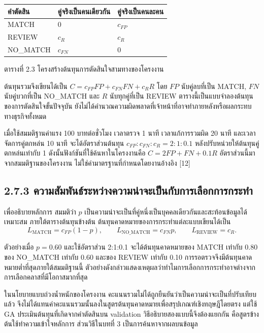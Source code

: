 \begin{center}\small
\begin{tabularx}{\linewidth}{p{3.2cm}XX}
\toprule
คำตัดสิน & คู่จริงเป็นคนเดียวกัน & คู่จริงเป็นคนละคน \\
\midrule
MATCH & 0 & $c_{FP}$ \\
REVIEW & $c_R$ & $c_R$ \\
NO\_MATCH & $c_{FN}$ & 0 \\
\bottomrule
\end{tabularx}
\par ตารางที่ 2.3 โครงสร้างต้นทุนการตัดสินใจสามทางของโครงงาน
\end{center}

ต้นทุนรวมจึงเขียนได้เป็น $C=c_{FP}FP+c_{FN}FN+c_RR$ โดย $FP$ นับคู่ลบที่เป็น MATCH, $FN$ นับคู่บวกที่เป็น NO\_MATCH และ $R$ นับทุกคู่ที่เป็น REVIEW ตารางนี้เป็นแบบจำลองต้นทุนของการตัดสินใจขั้นปัจจุบัน ยังไม่ได้คำนวณความผิดพลาดที่เจ้าหน้าที่อาจทำภายหลังหรือผลกระทบทางธุรกิจทั้งหมด

เมื่อใช้สมมติฐานค่าแรง 100 บาทต่อชั่วโมง เวลาตรวจ 1 นาที เวลาแก้การรวมผิด 20 นาที และเวลาจัดการคู่ตกหล่น 10 นาที จะได้อัตราส่วนต้นทุน $c_{FP}:c_{FN}:c_R=2:1:0.1$ หลังปรับหน่วยให้ต้นทุนคู่ตกหล่นเท่ากับ 1 ดังนั้นฟังก์ชันที่ใช้ค้นหาในโครงงานคือ $C=2FP+FN+0.1R$ อัตราส่วนนี้มาจากสมมติฐานของโครงงาน ไม่ใช่ค่ามาตรฐานที่กำหนดโดยงานอ้างอิง [12]

\subsection*{2.7.3 ความสัมพันธ์ระหว่างความน่าจะเป็นกับการเลือกการกระทำ}
เพื่ออธิบายหลักการ สมมติว่า $p$ เป็นความน่าจะเป็นที่คู่หนึ่งเป็นบุคคลเดียวกันและสะท้อนข้อมูลได้เหมาะสม ภายใต้ตารางต้นทุนข้างต้น ต้นทุนคาดหมายของการกระทำแต่ละแบบเขียนได้เป็น
\begin{equation*}
L_{\mathrm{MATCH}}=c_{FP}(1-p),\qquad
L_{\mathrm{NO\_MATCH}}=c_{FN}p,\qquad
L_{\mathrm{REVIEW}}=c_R.
\end{equation*}

ตัวอย่างเมื่อ $p=0.60$ และใช้อัตราส่วน 2:1:0.1 จะได้ต้นทุนคาดหมายของ MATCH เท่ากับ 0.80 ของ NO\_MATCH เท่ากับ 0.60 และของ REVIEW เท่ากับ 0.10 การรอตรวจจึงมีต้นทุนคาดหมายต่ำที่สุดภายใต้สมมติฐานนี้ ตัวอย่างดังกล่าวแสดงเหตุผลว่าทำไมการเลือกการกระทำอาจต่างจากการเลือกคลาสที่มีโอกาสมากที่สุด

ในนโยบายแบบถ่วงน้ำหนักของโครงงาน คะแนนรวมไม่ได้ถูกยืนยันว่าเป็นความน่าจะเป็นที่ปรับเทียบแล้ว จึงไม่ได้แทนค่าคะแนนรวมนั้นลงในสูตรต้นทุนคาดหมายเพื่อสรุปเกณฑ์เชิงทฤษฎีโดยตรง แต่ใช้ GA ประเมินต้นทุนที่เกิดจากคำตัดสินบน validation วิธีอธิบายสองแบบนี้จึงต้องแยกกัน คือสูตรข้างต้นใช้ทำความเข้าใจหลักการ ส่วนวิธีในบทที่ 3 เป็นการค้นหาจากผลบนข้อมูล

